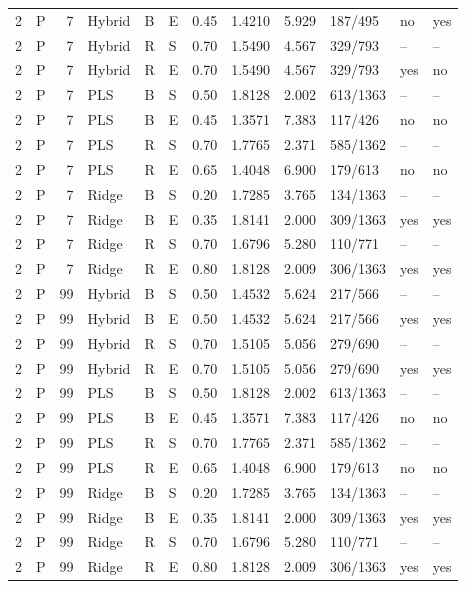 \documentclass[10pt,a4paper]{article}
\begin{document}
\begin{longtable}{rlrlllrrrlll}
2 & P & 7 & Hybrid & B & E & 0.45 & 1.4210 & 5.929 & 187/495 & no & yes \\
2 & P & 7 & Hybrid & R & S & 0.70 & 1.5490 & 4.567 & 329/793 & -- & -- \\
2 & P & 7 & Hybrid & R & E & 0.70 & 1.5490 & 4.567 & 329/793 & yes & no \\
2 & P & 7 & PLS & B & S & 0.50 & 1.8128 & 2.002 & 613/1363 & -- & -- \\
2 & P & 7 & PLS & B & E & 0.45 & 1.3571 & 7.383 & 117/426 & no & no \\
2 & P & 7 & PLS & R & S & 0.70 & 1.7765 & 2.371 & 585/1362 & -- & -- \\
2 & P & 7 & PLS & R & E & 0.65 & 1.4048 & 6.900 & 179/613 & no & no \\
2 & P & 7 & Ridge & B & S & 0.20 & 1.7285 & 3.765 & 134/1363 & -- & -- \\
2 & P & 7 & Ridge & B & E & 0.35 & 1.8141 & 2.000 & 309/1363 & yes & yes \\
2 & P & 7 & Ridge & R & S & 0.70 & 1.6796 & 5.280 & 110/771 & -- & -- \\
2 & P & 7 & Ridge & R & E & 0.80 & 1.8128 & 2.009 & 306/1363 & yes & yes \\
2 & P & 99 & Hybrid & B & S & 0.50 & 1.4532 & 5.624 & 217/566 & -- & -- \\
2 & P & 99 & Hybrid & B & E & 0.50 & 1.4532 & 5.624 & 217/566 & yes & yes \\
2 & P & 99 & Hybrid & R & S & 0.70 & 1.5105 & 5.056 & 279/690 & -- & -- \\
2 & P & 99 & Hybrid & R & E & 0.70 & 1.5105 & 5.056 & 279/690 & yes & yes \\
2 & P & 99 & PLS & B & S & 0.50 & 1.8128 & 2.002 & 613/1363 & -- & -- \\
2 & P & 99 & PLS & B & E & 0.45 & 1.3571 & 7.383 & 117/426 & no & no \\
2 & P & 99 & PLS & R & S & 0.70 & 1.7765 & 2.371 & 585/1362 & -- & -- \\
2 & P & 99 & PLS & R & E & 0.65 & 1.4048 & 6.900 & 179/613 & no & no \\
2 & P & 99 & Ridge & B & S & 0.20 & 1.7285 & 3.765 & 134/1363 & -- & -- \\
2 & P & 99 & Ridge & B & E & 0.35 & 1.8141 & 2.000 & 309/1363 & yes & yes \\
2 & P & 99 & Ridge & R & S & 0.70 & 1.6796 & 5.280 & 110/771 & -- & -- \\
2 & P & 99 & Ridge & R & E & 0.80 & 1.8128 & 2.009 & 306/1363 & yes & yes \\

\end{longtable}
\end{document}
